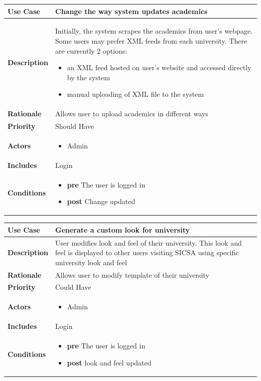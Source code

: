 
\begin{tabular}{|l|p{8.5cm}|}
\hline \textbf{Use Case} & Change the way system updates academics \\
 \hline \textbf{Description} & Initially, the system scrapes the academics from user's webpage. Some users may prefer XML feeds from each university.
 There are currently 2 options: 
 \begin{itemize}
  \item an XML feed hosted on user's website and accessed directly by the system
  \item manual uploading of XML file to the system
 \end{itemize} \\
\hline \textbf{Rationale} & Allows user to upload academics in different ways \\
\hline \textbf{Priority} & Should Have \\ 
\hline \textbf{Actors} & 
\begin{itemize}
 \item Admin
\end{itemize} \\
\hline \textbf{Includes} & Login \\
\hline \textbf{Conditions} & 
\begin{itemize}
 \item \textbf{pre} The user is logged in
 \item \textbf{post} Change updated
\end{itemize} \\ \hline
\end{tabular}


\begin{tabular}{|l|p{8.5cm}|}
\hline \textbf{Use Case} & Generate a custom look for university \\
 \hline \textbf{Description} & User modifies look and feel of their university. This look and feel is displayed to other users visiting SICSA using 
 specific university look and feel \\
\hline \textbf{Rationale} & Allows user to modify template of their university \\
\hline \textbf{Priority} & Could Have \\ 
\hline \textbf{Actors} & 
\begin{itemize}
 \item Admin
\end{itemize} \\
\hline \textbf{Includes} & Login \\
\hline \textbf{Conditions} & 
\begin{itemize}
 \item \textbf{pre} The user is logged in
 \item \textbf{post} look and feel updated
\end{itemize} \\ \hline
\end{tabular}

